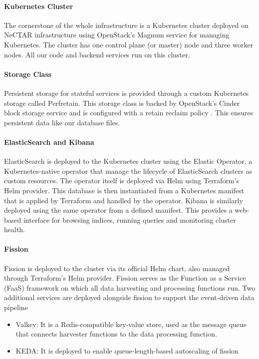 \paragraph{Kubernetes Cluster}
The cornerstone of the whole infrastructure is a Kubernetes cluster deployed on NeCTAR infrastructure using OpenStack's Magnum service for managing Kubernetes. The cluster has one control plane (or master) node and three worker nodes. All our code and backend services run on this cluster.

\paragraph{Storage Class}
Persistent storage for stateful services is provided through a custom Kubernetes storage called Perfretain. This storage class is backed by OpenStack’s Cinder block storage service and is configured with a retain reclaim policy \cite{malla2020self}. This ensures persistent data like our database files.

\paragraph{ElasticSearch and Kibana}
ElasticSearch is deployed to the Kubernetes cluster using the Elastic Operator, a Kubernetes-native operator that manage the lifecycle of ElasticSearch clusters as custom resources. The operator itself is deployed via Helm using Terraform's Helm provider. This database is then instantiated from a Kubernetes manifest that is applied by Terraform and handled by the operator. Kibana is similarly deployed using the same operator from a defined manifest. This provides a web-based interface for browsing indices, running queries and monitoring cluster health.

\paragraph{Fission}
Fission is deployed to the cluster via its official Helm chart, also managed through Terraform’s Helm provider. Fission serves as the Function as a Service (FaaS) framework on which all data harvesting and processing functions run. Two additional services are deployed alongside fission to support the event-driven data pipeline
\begin{itemize}
	\item Valkey: It is a Redis-compatible key-value store, used as the message queue that connects harvester functions to the data processing function.
	\item KEDA: It is deployed to enable queue-length-based autoscaling of fission
\end{itemize}



